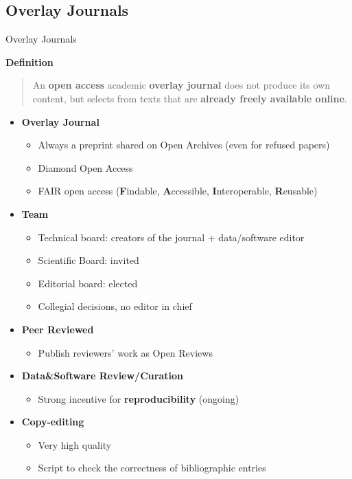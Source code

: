 \documentclass[10pt,compress,serif,aspectratio=169]{beamer}
\begin{document}

\subsection{Overlay Journals}

\begin{frame}[t]{Overlay Journals}

 \textbf{Definition}\newline\newline
 \begin{quote}
   An \textbf{open access} academic \textbf{overlay journal} does not produce its own content, but selects from texts that are \textbf{already freely available online}.
 \end{quote}

 
\end{frame}
 
\begin{frame}[t]
  \begin{itemize}
  \pause
  \item \textbf{Overlay Journal}
   \begin{itemize}
   \item Always a preprint shared on Open Archives (even for refused papers)
   \item Diamond Open Access
   \item FAIR open access (\textbf{F}indable, \textbf{A}ccessible, \textbf{I}nteroperable, \textbf{R}eusable)
   \end{itemize}
   \pause
 \item \textbf{Team}
   \begin{itemize}
   \item Technical board: creators of the journal + data/software editor
   \item Scientific Board: invited
   \item Editorial board: elected
   \item Collegial decisions, no editor in chief
   \end{itemize}
   \pause  
 \item\textbf{Peer Reviewed}
   \begin{itemize}
   \item Publish reviewers' work as Open Reviews
   \end{itemize}
   \pause
 \item\textbf{Data\&Software Review/Curation}
   \begin{itemize}
   \item Strong incentive for \textbf{reproducibility} (ongoing)
   \end{itemize}
   \pause
 \item \textbf{Copy-editing}
   \begin{itemize}
   \item Very high quality
   \item Script to check the correctness of bibliographic entries
   \end{itemize}
 \end{itemize}
\end{frame}
\end{document}
